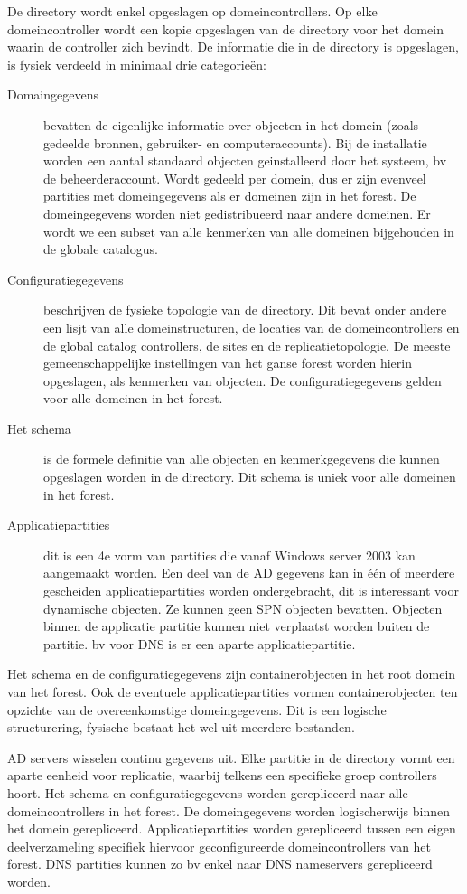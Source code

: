 De directory wordt enkel opgeslagen op domeincontrollers. Op elke
domeincontroller wordt een kopie opgeslagen van de directory voor het domein
waarin de controller zich bevindt. De informatie die in de directory is
opgeslagen, is fysiek verdeeld in minimaal drie categorieën: 
\begin{description}
	\item[Domaingegevens] bevatten de eigenlijke informatie over objecten in
		het domein (zoals gedeelde bronnen, gebruiker- en
		computeraccounts). Bij de installatie worden een aantal
		standaard objecten geinstalleerd door het systeem, bv de
		beheerderaccount. Wordt gedeeld per domein, dus er zijn evenveel
		partities met domeingegevens als er domeinen zijn in het forest.
		De domeingegevens worden niet gedistribueerd naar andere
		domeinen. Er wordt we een subset van alle kenmerken van alle
		domeinen bijgehouden in de globale catalogus.
	\item[Configuratiegegevens] beschrijven de fysieke topologie van de
		directory. Dit bevat onder andere een lisjt van alle
		domeinstructuren, de locaties van de domeincontrollers en de
		global catalog controllers, de sites en de replicatietopologie.
		De meeste gemeenschappelijke instellingen van het ganse forest
		worden hierin opgeslagen, als kenmerken van objecten. De
		configuratiegegevens gelden voor alle domeinen in het forest.
	\item[Het schema] is de formele definitie van alle objecten en
		kenmerkgegevens die kunnen opgeslagen worden in de directory.
		Dit schema is uniek voor alle domeinen in het forest.
	\item[Applicatiepartities] dit is een 4e vorm van partities die vanaf
		Windows server 2003 kan aangemaakt worden. Een deel van de AD
		gegevens kan in één of meerdere gescheiden applicatiepartities
		worden ondergebracht, dit is interessant voor dynamische
		objecten. Ze kunnen geen SPN objecten bevatten.  Objecten binnen
		de applicatie partitie kunnen niet verplaatst worden buiten de
		partitie. bv voor DNS is er een aparte applicatiepartitie.
\end{description}

Het schema en de configuratiegegevens zijn containerobjecten in het root domein
van het forest. Ook de eventuele applicatiepartities vormen containerobjecten
ten opzichte van de overeenkomstige domeingegevens. Dit is een logische
structurering, fysische bestaat het wel uit meerdere bestanden.

AD servers wisselen continu gegevens uit. Elke partitie in de directory vormt
een aparte eenheid voor replicatie, waarbij telkens een specifieke groep
controllers hoort. Het schema en configuratiegegevens worden gerepliceerd naar
alle domeincontrollers in het forest. De domeingegevens worden logischerwijs
binnen het domein gerepliceerd. Applicatiepartities worden gerepliceerd tussen
een eigen deelverzameling specifiek hiervoor geconfigureerde domeincontrollers
van het forest. DNS partities kunnen zo bv enkel naar DNS nameservers
gerepliceerd worden.

